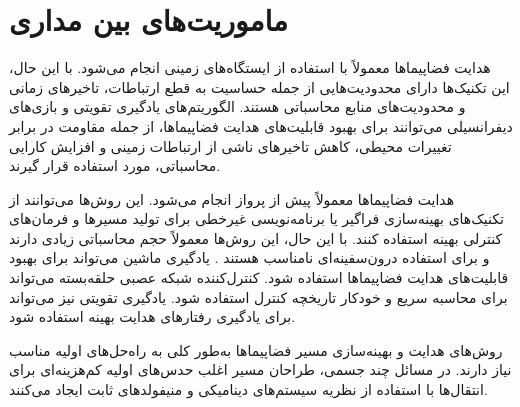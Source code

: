 \section{ماموریت‌های بین مداری}
هدایت فضاپیماها معمولاً با استفاده از ایستگاه‌های زمینی
انجام می‌شود. با این حال، این تکنیک‌ها دارای محدودیت‌هایی از جمله حساسیت به قطع ارتباطات، تاخیرهای زمانی و محدودیت‌های منابع محاسباتی هستند. الگوریتم‌های یادگیری تقویتی و بازی‌های دیفرانسیلی می‌توانند برای بهبود قابلیت‌های هدایت فضاپیماها، از جمله مقاومت در برابر تغییرات محیطی، کاهش تاخیرهای ناشی از ارتباطات زمینی و افزایش کارایی محاسباتی، مورد استفاده قرار گیرند.


هدایت فضاپیماها معمولاً  پیش از پرواز انجام می‌شود. این روش‌ها می‌توانند از تکنیک‌های بهینه‌سازی فراگیر  \cite{vavrina2017global} یا برنامه‌نویسی غیرخطی برای تولید مسیرها و فرمان‌های کنترلی بهینه استفاده کنند. با این حال، این روش‌ها معمولاً حجم محاسباتی زیادی دارند و برای استفاده درون‌سفینه‌ای نامناسب هستند \cite{ocampo2004finite}.
یادگیری ماشین می‌تواند برای بهبود قابلیت‌های هدایت فضاپیماها استفاده شود. کنترل‌کننده شبکه عصبی حلقه‌‌بسته می‌تواند برای محاسبه سریع و خودکار تاریخچه کنترل استفاده شود. یادگیری تقویتی نیز می‌تواند برای یادگیری رفتارهای هدایت بهینه استفاده شود.

روش‌های هدایت و بهینه‌سازی مسیر فضاپیماها به‌طور کلی به راه‌حل‌های اولیه مناسب نیاز دارند. در مسائل چند جسمی، طراحان مسیر اغلب حدس‌های اولیه کم‌هزینه‌ای برای انتقال‌ها با استفاده از نظریه سیستم‌های دینامیکی و منیفولدهای ثابت
\cite{2013AcAau, haapala2016framework}
ایجاد می‌کنند. 

